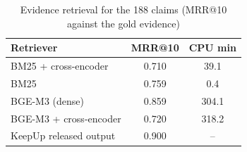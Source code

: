 \begin{table}[t]
\centering
\caption{Evidence retrieval for the 188 claims (MRR@10 against the gold evidence)}
\label{tab:retrieval}
\footnotesize
\begin{tabular}{lcc}
\toprule
Retriever & MRR@10 & CPU min\\
\midrule
BM25 + cross-encoder & 0.710 & 39.1\\
BM25 & 0.759 & 0.4\\
BGE-M3 (dense) & 0.859 & 304.1\\
BGE-M3 + cross-encoder & 0.720 & 318.2\\
KeepUp released output & 0.900 & --\\
\bottomrule
\end{tabular}
\end{table}
